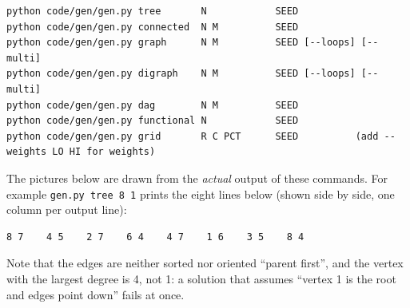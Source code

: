 \begin{lstlisting}[style=trace]
python code/gen/gen.py tree       N            SEED
python code/gen/gen.py connected  N M          SEED
python code/gen/gen.py graph      N M          SEED [--loops] [--multi]
python code/gen/gen.py digraph    N M          SEED [--loops] [--multi]
python code/gen/gen.py dag        N M          SEED
python code/gen/gen.py functional N            SEED
python code/gen/gen.py grid       R C PCT      SEED          (add --weights LO HI for weights)
\end{lstlisting}

The pictures below are drawn from the \emph{actual} output of these commands. For example \texttt{gen.py tree 8 1} prints the eight lines below (shown side by side, one column per output line):

\begin{lstlisting}[style=trace]
8 7    4 5    2 7    6 4    4 7    1 6    3 5    8 4
\end{lstlisting}

Note that the edges are neither sorted nor oriented ``parent first'', and the vertex with the largest degree is 4, not 1: a solution that assumes ``vertex 1 is the root and edges point down'' fails at once.

